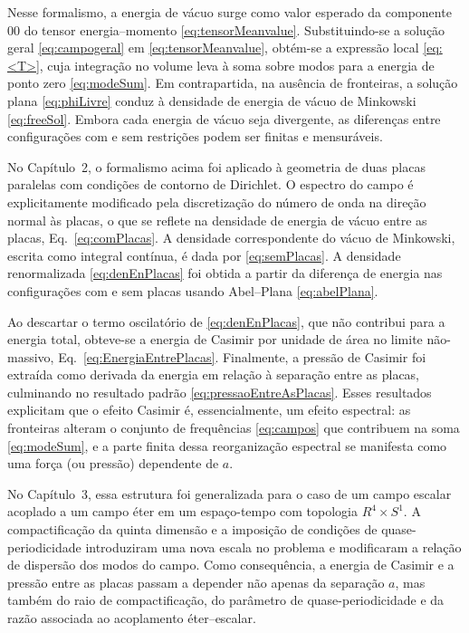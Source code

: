 Nesse formalismo, a energia de vácuo surge como valor esperado da componente $00$ do tensor energia--momento \eqref{eq:tensorMeanvalue}. Substituindo-se a solução geral \eqref{eq:campogeral} em \eqref{eq:tensorMeanvalue}, obtém-se a expressão local \eqref{eq:<T>}, cuja integração no volume leva à soma sobre modos para a energia de ponto zero \eqref{eq:modeSum}. Em contrapartida, na ausência de fronteiras, a solução plana \eqref{eq:phiLivre} conduz à densidade de energia de vácuo de Minkowski \eqref{eq:freeSol}. Embora cada energia de vácuo seja divergente, as diferenças entre configurações com e sem restrições podem ser finitas e mensuráveis.

No Capítulo~2, o formalismo acima foi aplicado à geometria de duas placas paralelas com condições de contorno de Dirichlet. O espectro do campo é explicitamente modificado pela discretização do número de onda na direção normal às placas, o que se reflete na densidade de energia de vácuo entre as placas, Eq.~\eqref{eq:comPlacas}. A densidade correspondente do vácuo de Minkowski, escrita como integral contínua, é dada por \eqref{eq:semPlacas}. A densidade renormalizada \eqref{eq:denEnPlacas} foi obtida a partir da diferença de energia nas configurações com e sem placas usando Abel--Plana \eqref{eq:abelPlana}.

Ao descartar o termo oscilatório de \eqref{eq:denEnPlacas}, que não contribui para a energia total, obteve-se a energia de Casimir por unidade de área no limite não-massivo, Eq.~\eqref{eq:EnergiaEntrePlacas}. Finalmente, a pressão de Casimir foi extraída como derivada da energia em relação à separação entre as placas, culminando no resultado padrão \eqref{eq:pressaoEntreAsPlacas}. Esses resultados explicitam que o efeito Casimir é, essencialmente, um efeito espectral: as fronteiras alteram o conjunto de frequências \eqref{eq:campos} que contribuem na soma \eqref{eq:modeSum}, e a parte finita dessa reorganização espectral se manifesta como uma força (ou pressão) dependente de $a$.

No Capítulo~3, essa estrutura foi generalizada para o caso de um campo escalar acoplado a um campo éter em um espaço-tempo com topologia $R^4 \times S^1$. A compactificação da quinta dimensão e a imposição de condições de quase-periodicidade introduziram uma nova escala no problema e modificaram a relação de dispersão dos modos do campo. Como consequência, a energia de Casimir e a pressão entre as placas passam a depender não apenas da separação $a$, mas também do raio de compactificação, do parâmetro de quase-periodicidade e da razão associada ao acoplamento éter--escalar.

